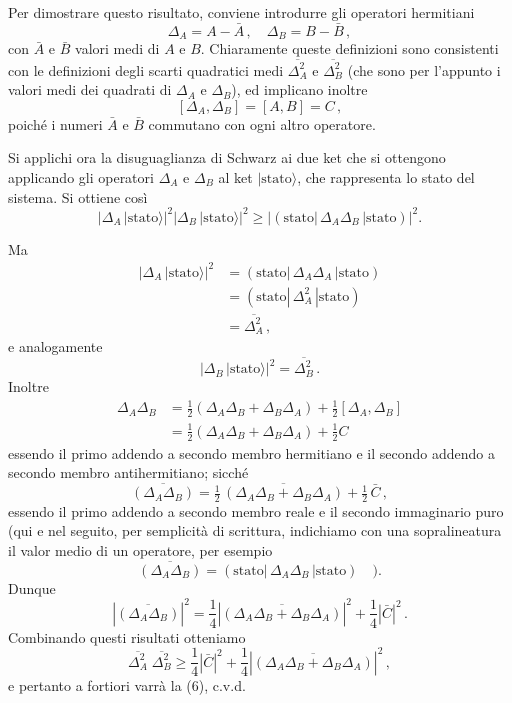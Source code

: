 \documentclass[11pt, a4paper]{book}
\numberwithin{equation}{section}
\begin{document}
Per dimostrare questo risultato, conviene introdurre gli operatori
hermitiani
\[
\Delta_A = A - \bar{A} \,, \quad \Delta_B = B - \bar{B} \,,
\]
con $\bar{A}$ e $\bar{B}$ valori medi di $A$ e $B$. Chiaramente queste definizioni sono
consistenti con le definizioni degli scarti quadratici medi $\overline{\Delta_A^2}$ e $\overline{\Delta_B^2}$
(che sono per l'appunto i valori medi dei quadrati di $\Delta_A$ e $\Delta_B$),
ed implicano inoltre
\[
[\Delta_A, \Delta_B] = [A, B] = C \,,
\]
poiché i numeri $\bar{A}$ e $\bar{B}$ commutano con ogni altro operatore.

Si applichi ora la disuguaglianza di Schwarz ai due ket che si
ottengono applicando gli operatori $\Delta_A$ e $\Delta_B$ al ket $|\text{stato}\rangle$, che rappresenta lo stato del sistema. Si ottiene così
\[
\left|\Delta_A\,|\text{stato}\rangle\right|^2 \left|\Delta_B\,|\text{stato}\rangle\right|^2 \geq \left|(\text{stato}|\,\Delta_A \Delta_B\,|\text{stato})\right|^2.
\]


Ma
\begin{align*}
\left|\Delta_A\,|\text{stato}\rangle\right|^2 &= (\text{stato}|\,\Delta_A \Delta_A\,|\text{stato}) \\
&= (\text{stato}|\,\Delta_A^2\,|\text{stato}) \\
&= \overline{\Delta_A^2} \,,
\end{align*}
e analogamente
\[
\left|\Delta_B\,|\text{stato}\rangle\right|^2 = \overline{\Delta_B^2} \,.
\]
Inoltre
\begin{align*}
\Delta_A \Delta_B &= \tfrac{1}{2}(\Delta_A \Delta_B + \Delta_B \Delta_A) + \tfrac{1}{2}[\Delta_A, \Delta_B] \\
&= \tfrac{1}{2}(\Delta_A \Delta_B + \Delta_B \Delta_A) + \tfrac{1}{2} C
\end{align*}
essendo il primo addendo a secondo membro hermitiano e
il secondo addendo a secondo membro antihermitiano; sicché
\[
\overline{(\Delta_A \Delta_B)} = \tfrac{1}{2}\,\overline{(\Delta_A \Delta_B + \Delta_B \Delta_A)} + \tfrac{1}{2}\,\bar{C} \,,
\]
essendo il primo addendo a secondo membro reale e il secondo immaginario puro (qui e nel seguito, per semplicità di scrittura, indichiamo
con una sopralineatura il valor medio di un operatore, per esempio
\[
\overline{(\Delta_A \Delta_B)} = (\text{stato}|\,\Delta_A \Delta_B\,|\text{stato}) \quad ).
\]
Dunque
\[
\left|\overline{(\Delta_A \Delta_B)}\right|^2 = \frac{1}{4}\left|\overline{(\Delta_A \Delta_B + \Delta_B \Delta_A)}\right|^2 + \frac{1}{4}\left|\bar{C}\right|^2 \,.
\]
Combinando questi risultati otteniamo
\[
\overline{\Delta_A^2}\;\overline{\Delta_B^2} \geq \frac{1}{4}\left|\bar{C}\right|^2 + \frac{1}{4}\left|\overline{(\Delta_A \Delta_B + \Delta_B \Delta_A)}\right|^2 \,,
\]
e pertanto a fortiori varrà la (6), c.v.d.
\end{document}
